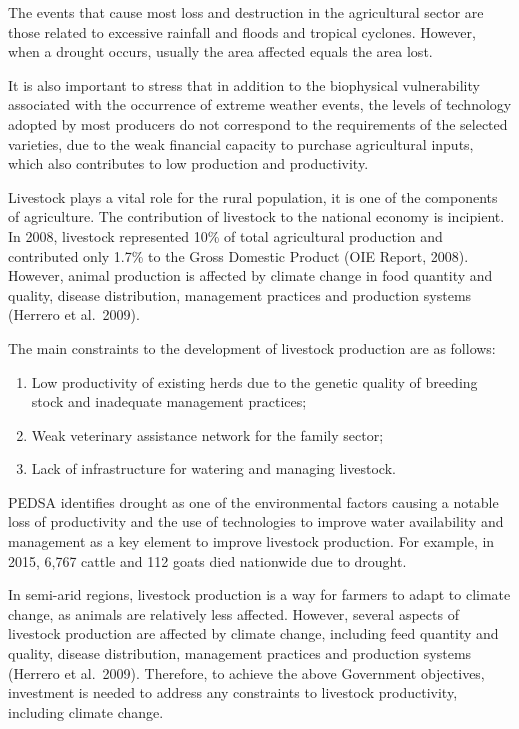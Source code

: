 \documentclass[
]{book}
\begin{document}
The events that cause most loss and destruction in the agricultural sector are those related to excessive rainfall and floods and tropical cyclones. However, when a drought occurs, usually the area affected equals the area lost.

It is also important to stress that in addition to the biophysical vulnerability associated with the occurrence of extreme weather events, the levels of technology adopted by most producers do not correspond to the requirements of the selected varieties, due to the weak financial capacity to purchase agricultural inputs, which also contributes to low production and productivity.

Livestock plays a vital role for the rural population, it is one of the components of agriculture. The contribution of livestock to the national economy is incipient. In 2008, livestock represented 10\% of total agricultural production and contributed only 1.7\% to the Gross Domestic Product (OIE Report, 2008). However, animal production is affected by climate change in food quantity and quality, disease distribution, management practices and production systems (Herrero et al.~2009).

The main constraints to the development of livestock production are as follows:

\begin{enumerate}
\def\labelenumi{(\roman{enumi})}
\item
  Low productivity of existing herds due to the genetic quality of breeding stock and inadequate management practices;
\item
  Weak veterinary assistance network for the family sector;
\item
  Lack of infrastructure for watering and managing livestock.
\end{enumerate}

PEDSA identifies drought as one of the environmental factors causing a notable loss of productivity and the use of technologies to improve water availability and management as a key element to improve livestock production. For example, in 2015, 6,767 cattle and 112 goats died nationwide due to drought.

In semi-arid regions, livestock production is a way for farmers to adapt to climate change, as animals are relatively less affected. However, several aspects of livestock production are affected by climate change, including feed quantity and quality, disease distribution, management practices and production systems (Herrero et al.~2009). Therefore, to achieve the above Government objectives, investment is needed to address any constraints to livestock productivity, including climate change.
\end{document}
